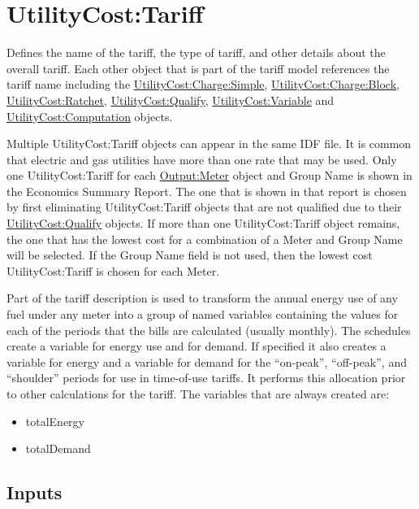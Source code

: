 \section{UtilityCost:Tariff}\label{utilitycosttariff}

Defines the name of the tariff, the type of tariff, and other details about the overall tariff. Each other object that is part of the tariff model references the tariff name including the \hyperref[utilitycostchargesimple]{UtilityCost:Charge:Simple}, \hyperref[utilitycostchargeblock]{UtilityCost:Charge:Block}, \hyperref[utilitycostratchet]{UtilityCost:Ratchet}, \hyperref[utilitycostqualify]{UtilityCost:Qualify}, \hyperref[utilitycostvariable]{UtilityCost:Variable} and \hyperref[utilitycostcomputation]{UtilityCost:Computation} objects.

Multiple UtilityCost:Tariff objects can appear in the same IDF file. It is common that electric and gas utilities have more than one rate that may be used. Only one UtilityCost:Tariff for each \hyperref[outputmeter-and-outputmetermeterfileonly]{Output:Meter} object and Group Name is shown in the Economics Summary Report. The one that is shown in that report is chosen by first eliminating UtilityCost:Tariff objects that are not qualified due to their \hyperref[utilitycostqualify]{UtilityCost:Qualify} objects. If more than one UtilityCost:Tariff object remains, the one that has the lowest cost for a combination of a Meter and Group Name will be selected. If the Group Name field is not used, then the lowest cost UtilityCost:Tariff is chosen for each Meter.

Part of the tariff description is used to transform the annual energy use of any fuel under any meter into a group of named variables containing the values for each of the periods that the bills are calculated (usually monthly). The schedules create a variable for energy use and for demand. If specified it also creates a variable for energy and a variable for demand for the ``on-peak'', ``off-peak'', and ``shoulder'' periods for use in time-of-use tariffs. It performs this allocation prior to other calculations for the tariff. The variables that are always created are:

\begin{itemize}
\item
  totalEnergy
\item
  totalDemand
\end{itemize}

\subsection{Inputs}\label{inputs-072}


